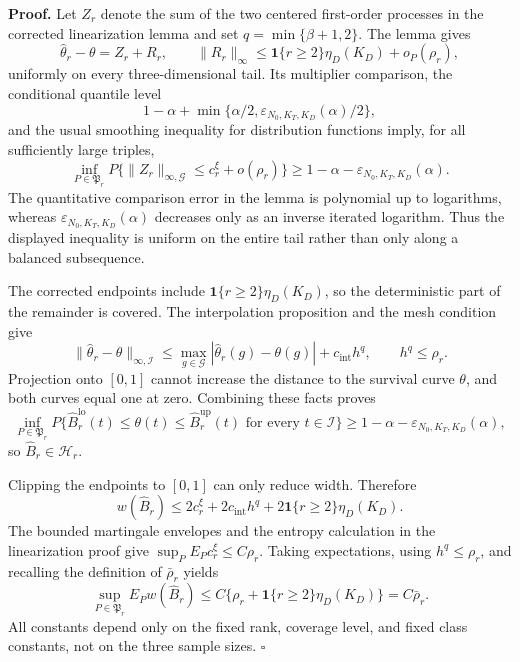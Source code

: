 \textbf{Proof.}
Let \(Z_r\) denote the sum of the two centered first-order processes in the corrected linearization lemma and set \(q=\min\{\beta+1,2\}\).  The lemma gives
\[
 \widehat\theta_r-\theta=Z_r+R_r,\qquad
 \|R_r\|_\infty\le\mathbf 1\{r\ge2\}\eta_D(K_D)+o_P(\rho_r),
\]
uniformly on every three-dimensional tail.  Its multiplier comparison, the conditional quantile level
\[
 1-\alpha+\min\{\alpha/2,\varepsilon_{N_0,K_T,K_D}(\alpha)/2\},
\]
and the usual smoothing inequality for distribution functions imply, for all sufficiently large triples,
\[
 \inf_{P\in\mathfrak P_r}
 P\{\|Z_r\|_{\infty,\mathcal G}\le c_r^\xi+o(\rho_r)\}
 \ge1-\alpha-\varepsilon_{N_0,K_T,K_D}(\alpha).
\]
The quantitative comparison error in the lemma is polynomial up to logarithms, whereas \(\varepsilon_{N_0,K_T,K_D}(\alpha)\) decreases only as an inverse iterated logarithm.  Thus the displayed inequality is uniform on the entire tail rather than only along a balanced subsequence.

The corrected endpoints include \(\mathbf 1\{r\ge2\}\eta_D(K_D)\), so the deterministic part of the remainder is covered.  The interpolation proposition and the mesh condition give
\[
 \|\widehat\theta_r-\theta\|_{\infty,\mathcal I}
 \le \max_{g\in\mathcal G}|\widehat\theta_r(g)-\theta(g)|+c_{\mathrm{int}}h^q,\qquad
 h^q\le\rho_r.
\]
Projection onto \([0,1]\) cannot increase the distance to the survival curve \(\theta\), and both curves equal one at zero.  Combining these facts proves
\[
 \inf_{P\in\mathfrak P_r}
 P\{\widehat B_r^{\mathrm{lo}}(t)\le\theta(t)\le\widehat B_r^{\mathrm{up}}(t)
 \text{ for every }t\in\mathcal I\}
 \ge1-\alpha-\varepsilon_{N_0,K_T,K_D}(\alpha),
\]
so \(\widehat B_r\in\mathcal H_r\).

Clipping the endpoints to \([0,1]\) can only reduce width.  Therefore
\[
 w(\widehat B_r)
 \le2c_r^\xi+2c_{\mathrm{int}}h^q
 +2\mathbf 1\{r\ge2\}\eta_D(K_D).
\]
The bounded martingale envelopes and the entropy calculation in the linearization proof give \(\sup_PE_Pc_r^\xi\le C\rho_r\).  Taking expectations, using \(h^q\le\rho_r\), and recalling the definition of \(\bar\rho_r\) yields
\[
 \sup_{P\in\mathfrak P_r}E_Pw(\widehat B_r)
 \le C\{\rho_r+\mathbf 1\{r\ge2\}\eta_D(K_D)\}
 =C\bar\rho_r.
\]
All constants depend only on the fixed rank, coverage level, and fixed class constants, not on the three sample sizes. \(\square\)